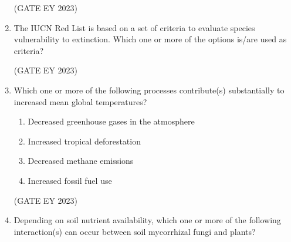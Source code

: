 \documentclass[journal,12pt,onecolumn]{IEEEtran}
\theoremstyle{remark}
\begin{document}
\begin{enumerate}
\begin{enumerate}
\end{enumerate}


\hfill{(GATE EY 2023)}




 \item The IUCN Red List is based on a set of criteria to evaluate species vulnerability to
extinction. Which one or more of the options is/are used as criteria?
\begin{enumerate}
\end{enumerate}

\hfill{(GATE EY 2023)}





 \item Which one or more of the following processes contribute(s) substantially to
increased mean global temperatures?

\begin{enumerate}

\item Decreased greenhouse gases in the atmosphere
\item Increased tropical deforestation
\item Decreased methane emissions
\item Increased fossil fuel use


\end{enumerate}
\hfill{(GATE EY 2023)}




 \item Depending on soil nutrient availability, which one or more of the following
interaction(s) can occur between soil mycorrhizal fungi and plants?

\begin{enumerate}
\end{enumerate}


\end{enumerate}
\end{document}
